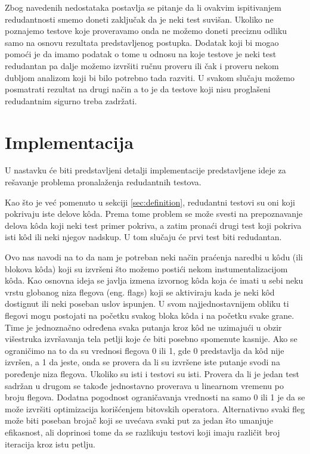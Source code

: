 \documentclass[a4paper]{article}
\begin{document}
Zbog navedenih nedostataka postavlja se pitanje da li ovakvim ispitivanjem redudantnosti smemo doneti zaključak da je neki test suvišan. Ukoliko ne poznajemo testove koje proveravamo onda ne možemo doneti preciznu odliku samo na osnovu rezultata predstavljenog postupka. Dodatak koji bi mogao pomoći je da imamo podatak o tome u odnosu na koje testove je neki test redudantan pa dalje možemo izvršiti ručnu proveru ili čak i proveru nekom dubljom analizom koji bi bilo potrebno tada razviti. U svakom slučaju možemo posmatrati rezultat na drugi način a to je da testove koji nisu proglašeni redudantnim sigurno treba zadržati.

\section{Implementacija}
\label{sec:ideas}
U nastavku će biti predstavljeni detalji implementacije predstavljene ideje za rešavanje problema pronalaženja redudantnih testova.

Kao što je već pomenuto u sekciji \ref{sec:definition}, redudantni testovi su oni koji pokrivaju iste delove kôda. Prema tome problem se može svesti na prepoznavanje delova kôda koji neki test primer pokriva, a zatim pronaći drugi test koji pokriva isti kôd ili neki njegov nadskup. U tom slučaju će prvi test biti redudantan. 

Ovo nas navodi na to da nam je potreban neki način praćenja naredbi u kôdu (ili blokova kôda) koji su izvršeni što možemo postići nekom instumentalizacijom kôda. Kao osnovna ideja se javlja izmena izvornog kôda koja će imati u sebi neku vrstu globanog niza flegova (eng. flags) koji se aktiviraju kada je neki kôd dostignut ili neki poseban uslov ispunjen. U svom najjednostavnijem obliku ti flegovi mogu postojati na početku svakog bloka kôda i na početku svake grane. Time je jednoznačno određena svaka putanja kroz kôd ne uzimajući u obzir višestruka izvršavanja tela petlji koje će biti posebno spomenute kasnije. Ako se ograničimo na to da su vrednosi flegova 0 ili 1, gde 0 predstavlja da kôd nije izvršen, a 1 da jeste, onda se provera da li su izvršene iste putanje svodi na poređenje niza flegova. Ukoliko su isti i testovi su isti. Provera da li je jedan test sadržan u drugom se takođe jednostavno proverava u linearnom vremenu po broju flegova. Dodatna pogodnost ograničavanja vrednosti na samo 0 ili 1 je da se može izvršiti optimizacija korišćenjem bitovskih operatora. Alternativno svaki fleg može biti poseban brojač koji se uvećava svaki put za jedan što umanjuje efikasnost, ali doprinosi tome da se razlikuju testovi koji imaju različit broj iteracija kroz istu petlju. 
\end{document}
